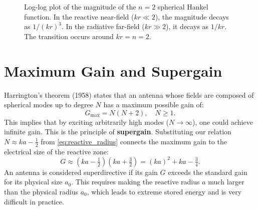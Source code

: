 \documentclass[11pt]{article}
\begin{document}
\begin{figure}[h!]
\centering
{}
\caption{Log-log plot of the magnitude of the $n=2$ spherical Hankel function. In the reactive near-field ($kr \ll 2$), the magnitude decays as $1/(kr)^3$. In the radiative far-field ($kr \gg 2$), it decays as $1/kr$. The transition occurs around $kr=n=2$.}
\end{figure}

\section{Maximum Gain and Supergain}

Harrington's theorem (1958) states that an antenna whose fields are composed of spherical modes up to degree $N$ has a maximum possible gain of:
\[
G_{\max}=N(N+2),\quad N\ge1.
\]
This implies that by exciting arbitrarily high modes ($N\to\infty$), one could achieve infinite gain. This is the principle of \textbf{supergain}. Substituting our relation $N \approx ka-\tfrac12$ from \eqref{eq:reactive_radius} connects the maximum gain to the electrical size of the reactive zone:
\[
G\approx\left(ka-\tfrac12\right)\left(ka+\tfrac32\right)
=(ka)^2+ka-\tfrac34.
\]
An antenna is considered superdirective if its gain $G$ exceeds the standard gain for its physical size $a_0$. This requires making the reactive radius $a$ much larger than the physical radius $a_0$, which leads to extreme stored energy and is very difficult in practice.
\end{document}
